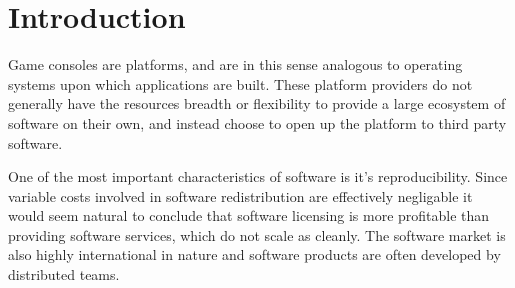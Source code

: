 \section*{Introduction}
Game consoles are platforms, and are in this sense analogous to operating systems upon which applications are built. These platform providers do not generally have the resources breadth or flexibility to provide a large ecosystem of software on their own, and instead choose to open up the platform to third party software.\autocite[30]{buxmann2012software}

One of the most important characteristics of software is it's reproducibility.\autocite[3]{buxmann2012software}
Since variable costs involved in software redistribution are effectively negligable it would seem natural to conclude that software licensing is more profitable than providing software services, which do not scale as cleanly.\autocite[3]{buxmann2012software}
The software market is also highly international in nature and software products are often developed by distributed teams.\autocite[3]{buxmann2012software}
